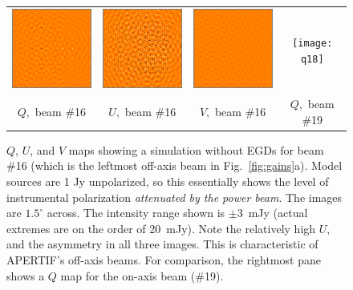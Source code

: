 \documentclass{aps2010} \special{papersize=8.5in,11in}
\begin{document}
\begin{figure}
\begin{tabular}{@{}cccc@{}}
\includegraphics[width=3.8cm]{q15} &
\includegraphics[width=3.8cm]{u15} &
\includegraphics[width=3.8cm]{v15} &
\texttt{[image: q18]} \\
$Q,$ beam \#16 & $U,$ beam \#16 & $V,$ beam \#16 & $Q,$ beam \#19
\end{tabular}
\caption{\label{fig:quv}$Q$, $U$, and $V$ maps showing a simulation without EGDs for beam \#16 (which is the leftmost off-axis beam in Fig.~\ref{fig:gains}a). Model sources are 1 Jy unpolarized, so this essentially shows the level of  instrumental polarization \emph{attenuated by the power beam}. The images are $1.5^\circ$ across. The intensity range shown is $\pm3$~mJy (actual extremes are on the order of 20~mJy). Note the relatively high $U$, and the asymmetry in all three images. This is characteristic of APERTIF's off-axis beams. For comparison, the rightmost pane shows a $Q$ map for the on-axis beam (\#19).}
\end{figure}
\end{document}

